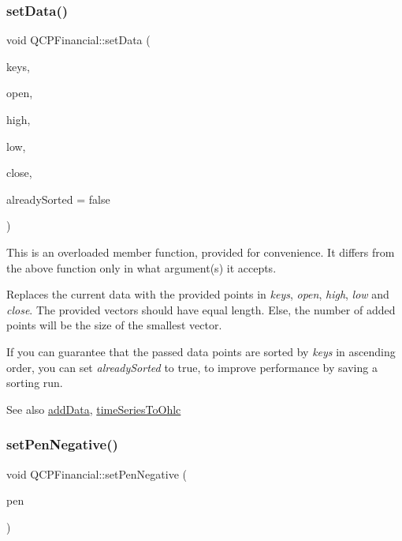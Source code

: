 \subsubsection{\texorpdfstring{set\+Data()}{setData()}\hspace{0.1cm}{\footnotesize\ttfamily [2/2]}}
{\footnotesize\ttfamily void Q\+C\+P\+Financial\+::set\+Data (\begin{DoxyParamCaption}\item[{const Q\+Vector$<$ double $>$ \&}]{keys,  }\item[{const Q\+Vector$<$ double $>$ \&}]{open,  }\item[{const Q\+Vector$<$ double $>$ \&}]{high,  }\item[{const Q\+Vector$<$ double $>$ \&}]{low,  }\item[{const Q\+Vector$<$ double $>$ \&}]{close,  }\item[{bool}]{already\+Sorted = {\ttfamily false} }\end{DoxyParamCaption})}

This is an overloaded member function, provided for convenience. It differs from the above function only in what argument(s) it accepts.

Replaces the current data with the provided points in {\itshape keys}, {\itshape open}, {\itshape high}, {\itshape low} and {\itshape close}. The provided vectors should have equal length. Else, the number of added points will be the size of the smallest vector.

If you can guarantee that the passed data points are sorted by {\itshape keys} in ascending order, you can set {\itshape already\+Sorted} to true, to improve performance by saving a sorting run.

\begin{DoxySeeAlso}{See also}
\hyperlink{classQCPFinancial_a372ac031e44a7a6c912d203556af96f7}{add\+Data}, \hyperlink{classQCPFinancial_a9a058c035040d3939b8884f4aaccb1a7}{time\+Series\+To\+Ohlc} 
\end{DoxySeeAlso}
\mbox{\label{classQCPFinancial_afe5c07e94ccea01a75b3a2476993c346}} 
\subsubsection{\texorpdfstring{set\+Pen\+Negative()}{setPenNegative()}}
{\footnotesize\ttfamily void Q\+C\+P\+Financial\+::set\+Pen\+Negative (\begin{DoxyParamCaption}\item[{const Q\+Pen \&}]{pen }\end{DoxyParamCaption})}

